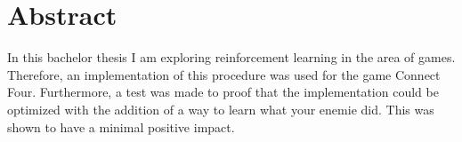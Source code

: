 \chapter{Abstract}
In this bachelor thesis I am exploring reinforcement learning in the area of games. Therefore, an implementation of this procedure was used for the game Connect Four. Furthermore, a test was made to proof that the implementation could be optimized with the addition of a way to learn what your enemie did. This was shown to have a minimal positive impact.

